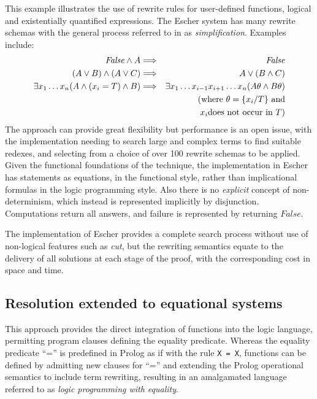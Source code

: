 This example illustrates the use of rewrite rules for user-defined functions, logical and
existentially quantified expressions. The
Escher system has many rewrite schemas
with the general process referred to in \cite{Llo94} as \textit{simplification}.
Examples include:
\begin{eqnarray*}
\mathit{False} \wedge A & \Longrightarrow & \mathit{False}\\
(A \vee B) \wedge (A \vee C) & \Longrightarrow & A \vee (B \wedge C)\\
\exists x_1\ldots x_n(A \wedge (x_i = T) \wedge B) & \Longrightarrow &
  \exists x_1\ldots x_{i-1}x_{i+1}\ldots x_n(A\theta \wedge B\theta)\\
 & & (\mbox{where } \theta = \{x_i/T\} \mbox{ and} \\
 & & \hspace*{5mm}x_i \mbox{does not occur in } T)\\
\end{eqnarray*}
The approach can provide great flexibility but performance is an open issue, with
the implementation needing to search large and complex terms to find suitable redexes, and
selecting from a choice of over 100 rewrite schemas to be applied.  Given the functional
foundations of the technique, the implementation in Escher has statements as equations, in the
functional style, rather than implicational formulas in the logic programming style.  Also there
is no \textit{explicit} concept of non-determinism, which instead is represented implicitly by
disjunction.  Computations return all answers, and failure is represented by returning $False$.

The implementation of Escher provides a complete search process without use of non-logical
features such as \textit{cut}, but the rewriting semantics equate to the delivery of all
solutions at each stage of the proof, with the corresponding cost in space and time.

\subsection{Resolution extended to equational systems}

This approach provides the direct integration of functions into the logic language, permitting
program clauses defining the equality predicate.  Whereas the equality predicate ``='' is
predefined in Prolog as if 
with the rule \texttt{X = X},  functions can be defined by admitting
new clauses for ``='' and extending the Prolog operational semantics to include
term rewriting, resulting in an amalgamated
language referred to as \textit{logic programming with equality}.

